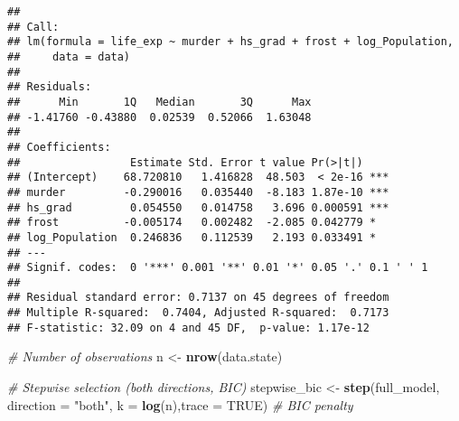 \documentclass[
]{article}
\newenvironment{Shaded}{\begin{snugshade}}{\end{snugshade}}
\newcommand{\AttributeTok}[1]{\textcolor[rgb]{0.13,0.29,0.53}{#1}}
\newcommand{\CommentTok}[1]{\textcolor[rgb]{0.56,0.35,0.01}{\textit{#1}}}
\newcommand{\ConstantTok}[1]{\textcolor[rgb]{0.56,0.35,0.01}{#1}}
\newcommand{\FunctionTok}[1]{\textcolor[rgb]{0.13,0.29,0.53}{\textbf{#1}}}
\newcommand{\NormalTok}[1]{#1}
\newcommand{\OtherTok}[1]{\textcolor[rgb]{0.56,0.35,0.01}{#1}}
\newcommand{\StringTok}[1]{\textcolor[rgb]{0.31,0.60,0.02}{#1}}
\begin{document}
\begin{verbatim}
## 
## Call:
## lm(formula = life_exp ~ murder + hs_grad + frost + log_Population, 
##     data = data)
## 
## Residuals:
##      Min       1Q   Median       3Q      Max 
## -1.41760 -0.43880  0.02539  0.52066  1.63048 
## 
## Coefficients:
##                 Estimate Std. Error t value Pr(>|t|)    
## (Intercept)    68.720810   1.416828  48.503  < 2e-16 ***
## murder         -0.290016   0.035440  -8.183 1.87e-10 ***
## hs_grad         0.054550   0.014758   3.696 0.000591 ***
## frost          -0.005174   0.002482  -2.085 0.042779 *  
## log_Population  0.246836   0.112539   2.193 0.033491 *  
## ---
## Signif. codes:  0 '***' 0.001 '**' 0.01 '*' 0.05 '.' 0.1 ' ' 1
## 
## Residual standard error: 0.7137 on 45 degrees of freedom
## Multiple R-squared:  0.7404, Adjusted R-squared:  0.7173 
## F-statistic: 32.09 on 4 and 45 DF,  p-value: 1.17e-12
\end{verbatim}

\begin{Shaded}
\begin{Highlighting}[]
\CommentTok{\# Number of observations}
\NormalTok{n }\OtherTok{\textless{}{-}} \FunctionTok{nrow}\NormalTok{(data.state)}

\CommentTok{\# Stepwise selection (both directions, BIC)}
\NormalTok{stepwise\_bic }\OtherTok{\textless{}{-}} \FunctionTok{step}\NormalTok{(full\_model, }
                     \AttributeTok{direction =} \StringTok{"both"}\NormalTok{, }
                     \AttributeTok{k =} \FunctionTok{log}\NormalTok{(n),}\AttributeTok{trace =} \ConstantTok{TRUE}\NormalTok{)  }\CommentTok{\# BIC penalty}
\end{Highlighting}
\end{Shaded}
\end{document}
